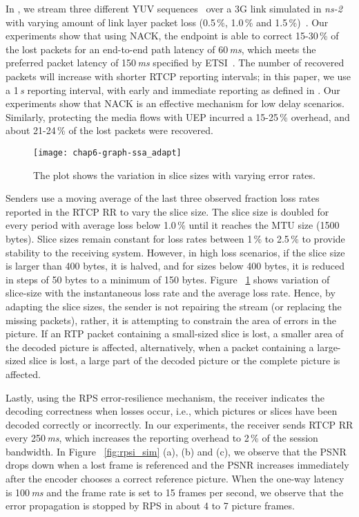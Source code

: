 In , we stream three different YUV sequences~\cite{YUV_seq} over a
3G link simulated in \emph{ns-2}~\cite{ns2} with varying amount of link layer
packet loss (0.5\,\%, 1.0\,\% and 1.5\,\%)~\cite{3gppSim}. Our experiments
show that using NACK, the endpoint is able to correct 15-30\,\% of the lost
packets for an end-to-end path latency of 60\,\emph{ms}, which meets the
preferred  packet latency of 150\,\emph{ms} specified by ETSI~\cite{etsi.qoe}.
The number of recovered packets will increase with shorter RTCP reporting
intervals; in this paper, we use a 1\,\emph{s} reporting interval, with early and
immediate reporting as defined in \cite{rfc4585}. Our experiments show that
NACK is an effective mechanism for low delay scenarios. Similarly, protecting
the media flows with UEP incurred a 15-25\,\% overhead, and about 21-24\,\% of
the lost packets were recovered.

\begin{figure}
\centerline {
\texttt{[image: chap6-graph-ssa\_adapt]}
}
\caption{The plot shows the variation in slice sizes with varying error
rates.}
\label{fig:ssa_adapt}
\end{figure}

Senders use a moving average of the last three observed fraction loss rates
reported in the RTCP RR to vary the slice size. The slice size is doubled for
every period with average loss below 1.0\,\% until it reaches the MTU size
(1500 bytes). Slice sizes remain constant for loss rates between 1\,\% to
2.5\,\% to provide stability to the receiving system. However, in high loss
scenarios, if the slice size is larger than 400 bytes, it is halved, and for
sizes below 400 bytes, it is reduced in steps of 50 bytes to a minimum of 150
bytes. Figure ~\ref{fig:ssa_adapt} shows variation of slice-size with the
instantaneous loss rate and the average loss rate. Hence, by adapting the
slice sizes, the sender is not repairing the stream (or replacing the missing
packets), rather, it is attempting to constrain the area of errors in the
picture. If an RTP packet containing a small-sized slice is lost, a smaller
area of the decoded picture is affected, alternatively, when a packet
containing a large-sized slice is lost, a large part of the decoded picture 
or the complete picture is affected.

Lastly, using the RPS error-resilience mechanism, the receiver indicates the
decoding correctness when losses occur, i.e., which pictures or slices have
been decoded correctly or incorrectly.  In our experiments, the receiver sends
RTCP RR every 250\,\emph{ms}, which increases the reporting overhead to 2\,\%
of the session bandwidth. In Figure ~\ref{fig:rpsi_sim} (a), (b) and (c), we
observe that the PSNR drops down when a lost frame is referenced and the PSNR
increases immediately after the encoder chooses a correct reference picture.
When the one-way latency is 100\,\emph{ms} and the frame rate is set to 15
frames per second, we observe that the error propagation is stopped by RPS in about
4 to 7 picture frames.


